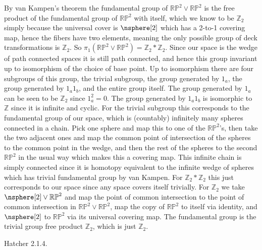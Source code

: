     \begin{solution}
        By van Kampen's theorem the fundamental group of
        $\mathbb{RP}^{2}\lor\mathbb{RP}^{2}$ is the free product of the
        fundamental group of $\mathbb{RP}^{2}$ with itself, which we know to be
        $\mathbb{Z}_{2}$ simply because the universal cover is $\nsphere[2]$
        which has a 2-to-1 covering map, hence the fibers have two elements,
        meaning the only possible group of deck transformations is
        $\mathbb{Z}_{2}$. So
        $\pi_{1}(\mathbb{RP}^{2}\lor\mathbb{RP}^{2})=\mathbb{Z}_{2}*\mathbb{Z}_{2}$.
        Since our space is the wedge of path connected spaces it is still path
        connected, and hence this group invariant up to isomorphism of the
        choice of base point. Up to isomorphism there are four subgroups of this
        group, the trivial subgroup, the group generated by $1_{a}$, the group
        generated by $1_{a}1_{b}$, and the entire group itself. The group
        generated by $1_{a}$ can be seen to be $\mathbb{Z}_{2}$ since
        $1_{a}^{2}=0$. The group generated by $1_{a}1_{b}$ is isomorphic to
        $\mathbb{Z}$ since it is infinite and cyclic. For the trivial subgroup
        this corresponds to the fundamental group of our space, which is
        (countably) infinitely many spheres connected in a chain. Pick one
        sphere and map this to one of the $\mathbb{RP}^{2}$'s, then take the two
        adjacent ones and map the common point of intersection of the spheres to
        the common point in the wedge, and then the rest of the spheres to the
        second $\mathbb{RP}^{2}$ in the usual way which makes this a covering
        map. This infinite chain is simply connected since it is homotopy
        equivalent to the infinite wedge of spheres which has trivial fundamental
        group by van Kampen. For $\mathbb{Z}_{2}*\mathbb{Z}_{2}$ this just
        corresponds to our space since any space covers itself trivially. For
        $\mathbb{Z}_{2}$ we take $\nsphere[2]\lor\mathbb{RP}^{2}$ and map the
        point of common intersection to the point of common intersection in
        $\mathbb{RP}^{2}\lor\mathbb{RP}^{2}$, map the copy of $\mathbb{RP}^{2}$
        to itself via identity, and $\nsphere[2]$ to $\mathbb{RP}^{2}$ via its
        universal covering map. The fundamental group is the trivial group
        free product $\mathbb{Z}_{2}$, which is just $\mathbb{Z}_{2}$.
    \end{solution}
    \begin{problem}
        Hatcher 2.1.4.
    \end{problem}
